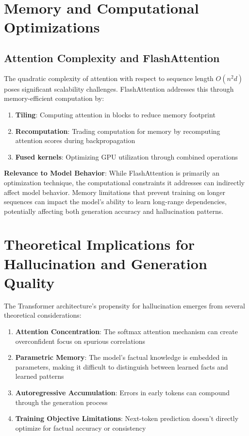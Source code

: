 \section{Memory and Computational Optimizations}

\subsection{Attention Complexity and FlashAttention}

The quadratic complexity of attention with respect to sequence length $O(n^2d)$ poses significant scalability challenges. FlashAttention addresses this through memory-efficient computation by:

\begin{enumerate}
\item \textbf{Tiling}: Computing attention in blocks to reduce memory footprint
\item \textbf{Recomputation}: Trading computation for memory by recomputing attention scores during backpropagation
\item \textbf{Fused kernels}: Optimizing GPU utilization through combined operations
\end{enumerate}

\textbf{Relevance to Model Behavior}: While FlashAttention is primarily an optimization technique, the computational constraints it addresses can indirectly affect model behavior. Memory limitations that prevent training on longer sequences can impact the model's ability to learn long-range dependencies, potentially affecting both generation accuracy and hallucination patterns.

\section{Theoretical Implications for Hallucination and Generation Quality}

The Transformer architecture's propensity for hallucination emerges from several theoretical considerations:

\begin{enumerate}
\item \textbf{Attention Concentration}: The softmax attention mechanism can create overconfident focus on spurious correlations
\item \textbf{Parametric Memory}: The model's factual knowledge is embedded in parameters, making it difficult to distinguish between learned facts and learned patterns
\item \textbf{Autoregressive Accumulation}: Errors in early tokens can compound through the generation process
\item \textbf{Training Objective Limitations}: Next-token prediction doesn't directly optimize for factual accuracy or consistency
\end{enumerate}

